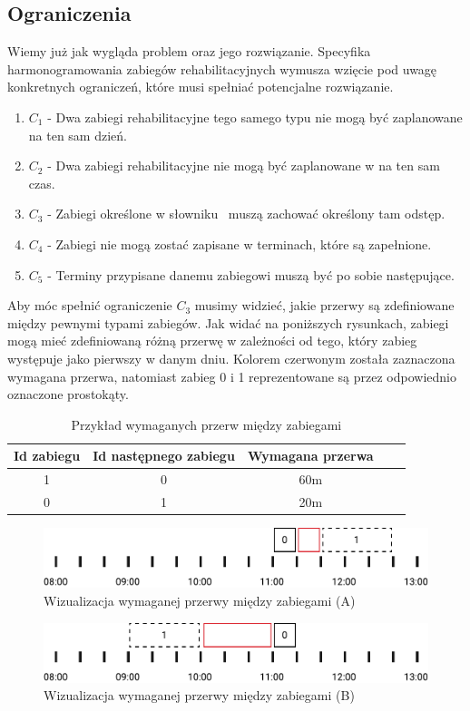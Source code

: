 \subsection{Ograniczenia}
\label{constraints}
Wiemy już jak wygląda problem oraz jego rozwiązanie. Specyfika
harmonogramowania zabiegów rehabilitacyjnych wymusza wzięcie pod uwagę
konkretnych ograniczeń, które musi spełniać potencjalne rozwiązanie.
\begin{enumerate}
	\item{$C_1$ - Dwa zabiegi rehabilitacyjne tego samego typu nie mogą być
		zaplanowane na ten sam dzień.}
	\item{$C_2$ - Dwa zabiegi rehabilitacyjne nie mogą być zaplanowane w na ten sam czas.}
	\item{$C_3$ - Zabiegi określone w słowniku \sGap\ muszą zachować określony tam odstęp.}
	\item{$C_4$ - Zabiegi nie mogą zostać zapisane w terminach, które są zapełnione.}
	\item{$C_5$ - Terminy przypisane danemu zabiegowi muszą być po sobie
		następujące.}
\end{enumerate}
Aby móc spełnić ograniczenie $C_3$ musimy widzieć, jakie przerwy są zdefiniowane
między pewnymi typami zabiegów. Jak widać na poniższych rysunkach, zabiegi mogą
mieć zdefiniowaną różną przerwę w zależności od tego, który zabieg występuje
jako pierwszy w danym dniu. Kolorem czerwonym została zaznaczona wymagana
przerwa, natomiast zabieg 0 i 1 reprezentowane są przez odpowiednio oznaczone
prostokąty.
\begin{table}[h]
	\centering
	\begin{tabular}{ | c | c | c | c | c | }
		\hline
		\bfseries Id zabiegu & \bfseries Id następnego zabiegu & \bfseries Wymagana przerwa \\
		\hline
		1 & 0 & 60m \\
		\hline
		0 & 1 & 20m \\
		\hline
	\end{tabular}
	\caption{Przykład wymaganych przerw między zabiegami}
	\label{example-gaps}
\end{table}
\begin{figure}[h]
	\centering
	\includegraphics[width=\textwidth]{gfx/gap_1.pdf}
	\caption{Wizualizacja wymaganej przerwy między zabiegami (A)}
	\label{example-gaps-1}
\end{figure}
\begin{figure}[h]
	\centering
	\includegraphics[width=\textwidth]{gfx/gap_2.pdf}
	\caption{Wizualizacja wymaganej przerwy między zabiegami (B)}
	\label{example-gaps-2}
\end{figure}
\pagebreak
